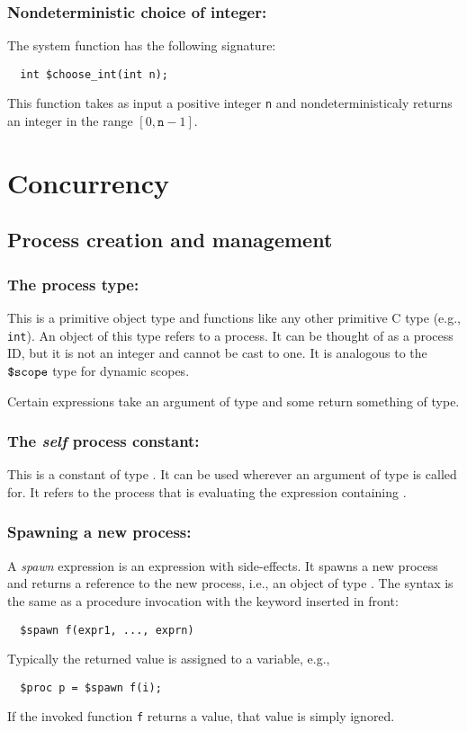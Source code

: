 \subsection{Nondeterministic choice of integer: \cchooseint}

The system function \cchooseint{} has the following signature:
\begin{verbatim}
  int $choose_int(int n);
\end{verbatim}
This function takes as input a positive integer \texttt{n} and
nondeterministicaly returns an integer in the range
$[0,\texttt{n}-1]$.


\chapter{Concurrency}
\label{chap:concurrency}

\section{Process creation and management}

\subsection{The process type: \cproc}

This is a primitive object type and functions like any other primitive
C type (e.g., \texttt{int}). An object of this type refers to a
process. It can be thought of as a process ID, but it is not an
integer and cannot be cast to one.  It is analogous to the $\mbox{\texttt{\${}scope}}$
type for dynamic scopes.

Certain expressions take an argument of \cproc{} type and some return
something of \cproc{} type.

\subsection{The \emph{self} process constant: \cself}

This is a constant of type \cproc. It can be used wherever an argument
of type \cproc{} is called for. It refers to the process that is
evaluating the expression containing \cself.

\subsection{Spawning a new process: \cspawn}

A \emph{spawn} expression is an expression with side-effects.  It
spawns a new process and returns a reference to the new process, i.e.,
an object of type \cproc.  The syntax is the same as a procedure
invocation with the keyword \cspawn{} inserted in front:
\begin{verbatim}
  $spawn f(expr1, ..., exprn)
\end{verbatim}
Typically the returned value is assigned to a variable, e.g.,
\begin{verbatim}
  $proc p = $spawn f(i);
\end{verbatim}
If the invoked function \texttt{f} returns a value, that value is
simply ignored.

